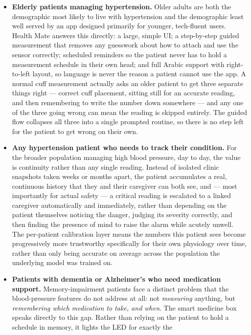 \documentclass[12pt,a4paper]{report}
\begin{document}
\begin{itemize}[leftmargin=1.4em]
  \item \textbf{Elderly patients managing hypertension.} Older adults are both
  the demographic most likely to live with hypertension and the demographic
  least well served by an app designed primarily for younger, tech-fluent
  users. Health Mate answers this directly: a large, simple UI; a
  step-by-step guided measurement that removes any guesswork about how to
  attach and use the sensor correctly; scheduled reminders so the patient
  never has to hold a measurement schedule in their own head; and full Arabic
  support with right-to-left layout, so language is never the reason a patient
  cannot use the app. A normal cuff measurement actually asks an older patient
  to get three separate things right --- correct cuff placement, sitting still
  for an accurate reading, and then remembering to write the number down
  somewhere --- and any one of the three going wrong can mean the reading is
  skipped entirely. The guided flow collapses all three into a single prompted
  routine, so there is no step left for the patient to get wrong on their own.
  \item \textbf{Any hypertension patient who needs to track their condition.}
  For the broader population managing high blood pressure, day to day, the
  value is continuity rather than any single reading. Instead of isolated
  clinic snapshots taken weeks or months apart, the patient accumulates a real,
  continuous history that they and their caregiver can both see, and --- most
  importantly for actual safety --- a critical reading is escalated to a
  linked caregiver automatically and immediately, rather than depending on the
  patient themselves noticing the danger, judging its severity correctly, and
  then finding the presence of mind to raise the alarm while acutely unwell.
  The per-patient calibration layer means the numbers this patient sees become
  progressively more trustworthy specifically for their own physiology over
  time, rather than only being accurate on average across the population the
  underlying model was trained on.
  \item \textbf{Patients with dementia or Alzheimer's who need medication
  support.} Memory-impairment patients face a distinct problem that the
  blood-pressure features do not address at all: not \emph{measuring}
  anything, but \emph{remembering which medication to take, and when}. The
  smart medicine box speaks directly to this gap. Rather than relying on the
  patient to hold a schedule in memory, it lights the LED for exactly the

\end{itemize}
\end{document}
